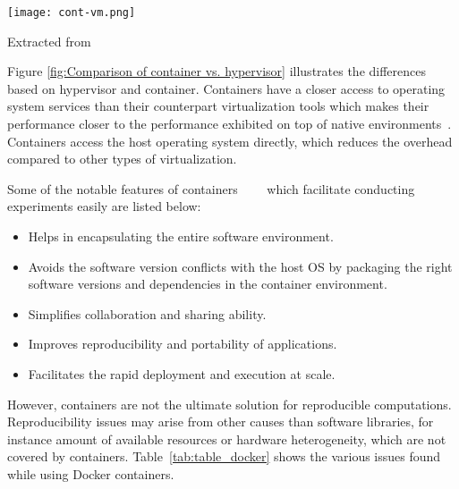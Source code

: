 \begin{center}
\texttt{[image: cont-vm.png]}
\label{fig:Comparison of container vs. hypervisor}
\caption*{Extracted from \cite{7382987}}
\end{center}

Figure \ref{fig:Comparison of container vs. hypervisor} illustrates the differences based on hypervisor and container. Containers have a closer access to operating system services than their counterpart virtualization tools which makes their performance closer to the performance exhibited on top of native environments~\cite{Xavier:2013:PEC:2497369.2497577}. Containers access the host operating system directly, which reduces the overhead compared to other types of virtualization.

Some of the notable features of containers~\cite{docker-run}~\cite{DBLP:journals/corr/HaleLRW16}~\cite{Julian:2016:CRI:2949550.2949562}~\cite{10.1109/ISPASS.2015.7095802} which facilitate conducting experiments easily are listed below:

\begin{itemize}
  \item Helps in encapsulating the entire software environment.
  \item Avoids the software version conflicts with the host OS by packaging the right software versions and dependencies in the container environment.
  \item Simplifies collaboration and sharing ability.
  \item Improves reproducibility and portability of applications.
  \item Facilitates the rapid deployment and execution at scale.
\end{itemize}


However, containers are not the ultimate solution for reproducible computations. Reproducibility issues may arise from other causes than software libraries, for instance amount of available resources or hardware heterogeneity, which are not covered by containers. Table~\ref{tab:table_docker} shows the various issues found while using Docker containers.

